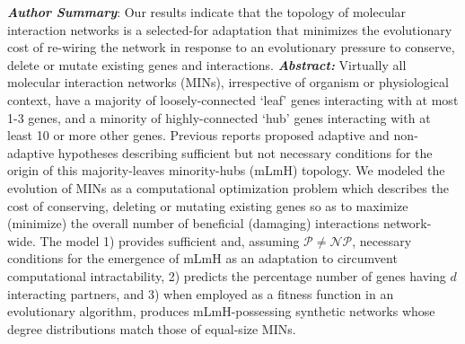 \vspace{25pt}
{\noindent\textit{\textbf{Author Summary}}: Our results indicate that the topology of molecular interaction networks is a selected-for adaptation that minimizes the evolutionary cost of re-wiring the network in response to an evolutionary pressure to conserve, delete or mutate existing genes and interactions.}
\vspace{33pt}
\noindent\textit{\textbf{Abstract:}} Virtually all molecular interaction networks (MINs), irrespective of organism or physiological context, have a majority of loosely-connected `leaf' genes interacting with at most 1-3 genes, and a minority of highly-connected `hub' genes interacting with at least 10 or more other genes.
    Previous reports proposed adaptive and non-adaptive hypotheses describing sufficient but not necessary conditions for the origin of this majority-leaves minority-hubs (mLmH) topology.
    We modeled the evolution of MINs as a computational optimization problem which describes the cost of conserving, deleting or mutating existing genes so as to maximize (minimize) the overall number of beneficial (damaging) interactions network-wide.
    The model 1) provides sufficient and, assuming $\mathcal{P}\neq \mathcal{NP}$, necessary conditions for the emergence of mLmH as an adaptation to circumvent computational intractability, 2) predicts the percentage number of genes having $d$ interacting partners, and 3) when employed as a fitness function in an evolutionary algorithm, produces mLmH-possessing synthetic networks whose degree distributions match those of equal-size MINs.

  
